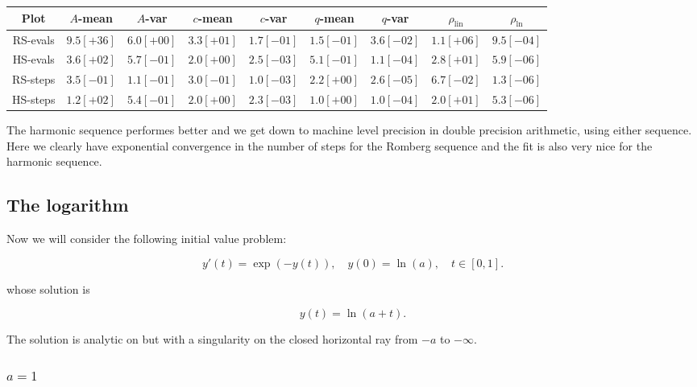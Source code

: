 \begin{table}[H]
    \centering
    \small
    \begin{tabular}{c||c|c|c|c|c|c|c|c}
Plot & \(A\)-mean & \(A\)-var & \(c\)-mean & \(c\)-var & \(q\)-mean & \(q\)-var & \(\rho_{\operatorname{lin}}\) & \(\rho_{\ln}\)\\\hline
\rowcolor{red}
RS-evals & \(9.5[+36]\) & \(6.0[+00]\) & \(3.3[+01]\) & \(1.7[-01]\) & \(1.5[-01]\) & \(3.6[-02]\) & \(1.1[+06]\) & \(9.5[-04]\) \\
\rowcolor{green}
HS-evals & \(3.6[+02]\) & \(5.7[-01]\) & \(2.0[+00]\) & \(2.5[-03]\) & \(5.1[-01]\) & \(1.1[-04]\) & \(2.8[+01]\) & \(5.9[-06]\) \\
\rowcolor{green}
RS-steps & \(3.5[-01]\) & \(1.1[-01]\) & \(3.0[-01]\) & \(1.0[-03]\) & \(2.2[+00]\) & \(2.6[-05]\) & \(6.7[-02]\) & \(1.3[-06]\) \\
\rowcolor{green}
HS-steps & \(1.2[+02]\) & \(5.4[-01]\) & \(2.0[+00]\) & \(2.3[-03]\) & \(1.0[+00]\) & \(1.0[-04]\) & \(2.0[+01]\) & \(5.3[-06]\) \\
    \end{tabular}
    \label{tab:my_label}
\end{table}

The harmonic sequence performes better and we get down to machine level precision in double precision arithmetic, using either sequence.\\

Here we clearly have exponential convergence in the number of steps for the Romberg sequence and the fit is also very nice for the harmonic sequence.

\subsection{The logarithm}

Now we will consider the following initial value problem:

\begin{equation}
y'(t) = \exp(-y(t)), \quad y(0) = \ln(a), \quad t\in [0,1].
\end{equation}

whose solution is 

\[
y(t) = \ln(a + t).
\]

The solution is analytic on but with a singularity on the closed horizontal ray from \(-a\) to \(-\infty\).

\subsubsection{\(a = 1\)}


